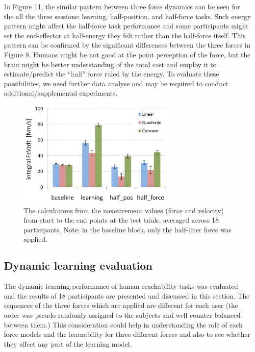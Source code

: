 In Figure 11, the similar pattern between three force dynamics can be seen for the all the three sessions: learning, half-position, and half-force tasks. Such energy pattern might affect the half-force task performance and some participants might set the end-effector at half-energy they felt rather than the half-force itself. This pattern can be confirmed by the significant differences between the three forces in Figure 8. Humans might be not good at the point perception of the force, but the brain might be better understanding of the total cost and employ it to estimate/predict the “half” force ruled by the energy. To evaluate these possibilities, we need further data analyse and may be required to conduct additional/supplemental experiments.
%
\begin{figure}
	\centering
	\includegraphics[width=0.7\textwidth]{Chie/figs/Figure11.png}
	\caption{The calculations from the measurement values (force and velocity) from start to the end points at the test trials, averaged across 18 participants.  Note: in the baseline block, only the half-liner force was applied.}
	\label{forcevel}
\end{figure}

\subsection{Dynamic learning evaluation}
The dynamic learning performance of human reachability tasks was evaluated and the results of 18 participants are presented and discussed in this section. The sequences of the three forces which are applied are different for each user (the order was pseudo-randomly assigned to the subjects and well counter balanced between them.) This consideration could help in understanding the role of each force models and the learnability for three different forces and also to see whether they affect any part of the learning model.

